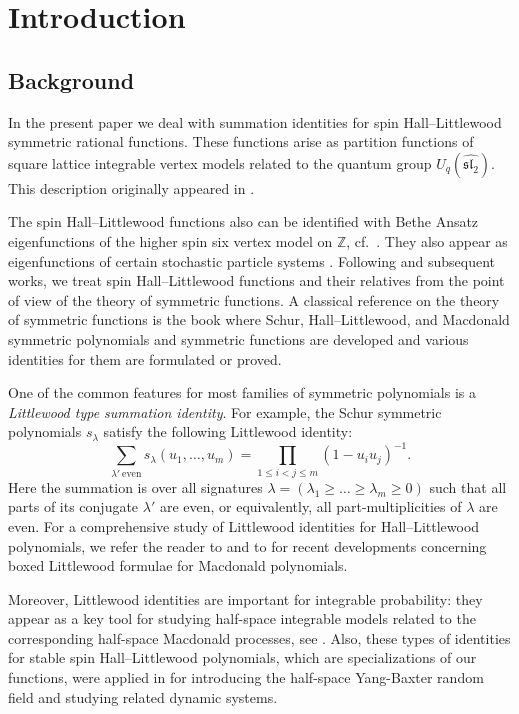 \documentclass[11pt]{article}
\theoremstyle{definition}
\providecommand{\cf}{cf.\ }
\begin{document}
\section{Introduction}
\label{sec:intro}
\subsection{Background}

In the present paper we deal with summation 
identities for spin Hall--Little\-wood symmetric
rational functions. These functions
arise
as 
partition functions
of square lattice integrable
vertex models
related to the quantum group $U_q(\widehat{\mathfrak{sl}_2})$. This description originally appeared in \cite{Bor17,BP18}.

The spin Hall--Littlewood functions
also can be identified with Bethe Ansatz eigenfunctions 
of the higher spin six vertex model on $\mathbb{Z}$, \cf \cite[Ch. VII]{KBI93}.
They also appear as eigenfunctions of certain stochastic particle systems
\cite{Pov13,BCPS15,CP16}. Following
\cite{Bor17,BP18} and subsequent works, we treat spin Hall--Littlewood functions and their relatives from the point of
view of the theory of symmetric functions.
A classical reference on the theory of symmetric functions is the book
\cite{Mac95} where Schur, Hall--Littlewood, and Macdonald symmetric
polynomials
and symmetric functions are developed and various identities for them are formulated or proved.


One of the common features 
for most
families of symmetric polynomials
is a \emph{Littlewood type summation identity}. For example, the Schur symmetric polynomials $s_{\lambda}$ satisfy the following Littlewood identity:
\begin{equation*}
\sum_{\lambda'\ \text{even}} s_{\lambda}(u_1, \dots, u_m)
=
\prod_{1 \leq i<j\leq m}
(1 - u_i u_j)^{-1}.
\end{equation*}
Here the summation is over all signatures $\lambda=(\lambda_1\ge \ldots\ge \lambda_m\ge0 )$ such that all parts of its conjugate $\lambda'$ are even, or equivalently, all part-multiplicities of $\lambda$ are even.
For a comprehensive study of Littlewood identities for
Hall–Littlewood polynomials, we refer the reader to \cite[Ch. III]{Mac95} and to \cite{War06,RW21} for recent developments concerning boxed Littlewood formulae for
Macdonald polynomials.

Moreover, Littlewood identities are important for integrable probability: they appear as a key tool for studying half-space integrable models related to the corresponding half-space Macdonald processes, see \cite{BBC20,BBCW18,BZ19}. Also, these types of identities for stable spin Hall--Littlewood polynomials, which are specializations of our functions, were applied in \cite{CD21} for introducing the half-space Yang-Baxter random field and studying related dynamic systems.
\end{document}
